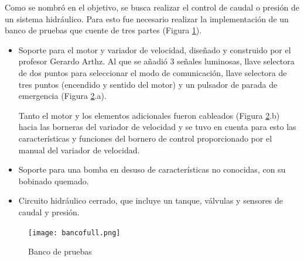 Como se nombró en el objetivo, se busca realizar el control de caudal o presión de un sistema hidráulico. Para esto fue necesario realizar la implementación de un banco de pruebas que cuente de tres partes (Figura \ref{fig:bancofull}).
\begin{itemize}
	\item Soporte para el motor y variador de velocidad,  diseñado y construido por el profesor Gerardo Arthz. 
Al que se añadió 3 señales luminosas, llave selectora de dos puntos para seleccionar el modo de comunicación, llave selectora de tres puntos (encendido y sentido del motor) y un pulsador de parada de emergencia (Figura \ref{fig:banco}.a).

	Tanto el motor y los elementos adicionales fueron cableados (Figura \ref{fig:banco}.b) hacia las borneras del variador de velocidad y se tuvo en cuenta para esto las características y funciones del bornero de control proporcionado por el manual del variador de velocidad\cite{InstaManual}. 
	
	\item Soporte para una bomba en desuso de características no conocidas, con su bobinado quemado.
	\item Circuito hidráulico cerrado, que incluye un tanque, válvulas y sensores de caudal y presión.
\end{itemize}




\begin{figure}[htb]
	\centering
	\texttt{[image: bancofull.png]}
	\label{fig:bancofull}
\end{figure}


\begin{figure}[H]
	\centering
	\caption{Banco de pruebas} \label{fig:banco}
\end{figure}

